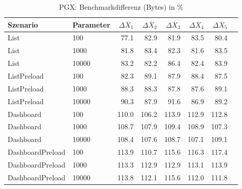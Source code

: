
\begin{table}[ht]
\setlength{\extrarowheight}{-1pt}
\centering
\caption{PGX: Benchmarkdifferenz (Bytes) in \%}
\begin{tabular}{llrrrrrr}
\toprule
Szenario & Parameter & ${\Delta \overline{X}_1}$ & ${\Delta \overline{X}_2}$ & ${\Delta \overline{X}_3}$ & ${\Delta \overline{X}_4}$ & ${\Delta \overline{X}_5}$ \\
\midrule
	List & 100 & \cellcolor{green!19}  77.1 & \cellcolor{green!17}  82.9 & \cellcolor{green!17}  81.9 & \cellcolor{green!17}  83.5 & \cellcolor{green!18}  80.4 \\
	List & 1000 & \cellcolor{green!17}  81.8 & \cellcolor{green!17}  83.4 & \cellcolor{green!17}  82.3 & \cellcolor{green!17}  81.6 & \cellcolor{green!17}  83.5 \\
	List & 10000 & \cellcolor{green!17}  83.2 & \cellcolor{green!17}  82.2 & \cellcolor{green!15}  86.4 & \cellcolor{green!17}  82.4 & \cellcolor{green!16}  83.9 \\
	ListPreload & 100 & \cellcolor{green!17}  82.3 & \cellcolor{green!14}  89.1 & \cellcolor{green!15}  87.9 & \cellcolor{green!15}  88.4 & \cellcolor{green!15}  87.5 \\
	ListPreload & 1000 & \cellcolor{green!15}  88.3 & \cellcolor{green!15}  88.3 & \cellcolor{green!15}  87.8 & \cellcolor{green!15}  87.6 & \cellcolor{green!14}  89.1 \\
	ListPreload & 10000 & \cellcolor{green!14}  90.3 & \cellcolor{green!15}  87.9 & \cellcolor{green!13}  91.6 & \cellcolor{green!15}  86.9 & \cellcolor{green!14}  89.2 \\
	Dashboard & 100 & \cellcolor{red!14}  110.0 & \cellcolor{red!12}  106.2 & \cellcolor{red!16}  113.9 & \cellcolor{red!15}  112.9 & \cellcolor{red!15}  112.8 \\
	Dashboard & 1000 & \cellcolor{red!13}  108.7 & \cellcolor{red!13}  107.9 & \cellcolor{red!14}  109.4 & \cellcolor{red!14}  108.9 & \cellcolor{red!13}  107.3 \\
	Dashboard & 10000 & \cellcolor{red!13}  108.4 & \cellcolor{red!13}  107.6 & \cellcolor{red!13}  108.7 & \cellcolor{red!13}  107.1 & \cellcolor{red!14}  109.1 \\
	DashboardPreload & 100 & \cellcolor{red!16}  113.9 & \cellcolor{red!14}  110.7 & \cellcolor{red!16}  115.6 & \cellcolor{red!17}  116.3 & \cellcolor{red!17}  117.4 \\
	DashboardPreload & 1000 & \cellcolor{red!15}  113.3 & \cellcolor{red!15}  112.9 & \cellcolor{red!15}  112.9 & \cellcolor{red!15}  113.1 & \cellcolor{red!16}  113.9 \\
	DashboardPreload & 10000 & \cellcolor{red!16}  113.8 & \cellcolor{red!15}  112.1 & \cellcolor{red!16}  115.6 & \cellcolor{red!15}  112.0 & \cellcolor{red!15}  111.8 \\
\bottomrule
\end{tabular}
\label{tab:benchmarkdifferenz_pgx_bytes}
\end{table}
	